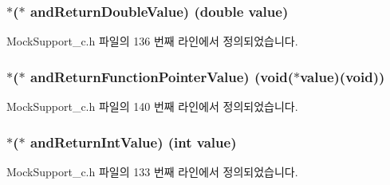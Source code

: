 \subsubsection[{\texorpdfstring{and\+Return\+Double\+Value}{andReturnDoubleValue}}]{$\ast$($\ast$ and\+Return\+Double\+Value) (double value)}\hypertarget{struct_s_mock_expected_call__c_a196e06d2d3472fc40be05701eb76d89f}{}\label{struct_s_mock_expected_call__c_a196e06d2d3472fc40be05701eb76d89f}


Mock\+Support\+\_\+c.\+h 파일의 136 번째 라인에서 정의되었습니다.

\subsubsection[{\texorpdfstring{and\+Return\+Function\+Pointer\+Value}{andReturnFunctionPointerValue}}]{$\ast$($\ast$ and\+Return\+Function\+Pointer\+Value) (void($\ast$value)(void))}\hypertarget{struct_s_mock_expected_call__c_aec92994602c7b6348285beaad764d3e8}{}\label{struct_s_mock_expected_call__c_aec92994602c7b6348285beaad764d3e8}


Mock\+Support\+\_\+c.\+h 파일의 140 번째 라인에서 정의되었습니다.

\subsubsection[{\texorpdfstring{and\+Return\+Int\+Value}{andReturnIntValue}}]{$\ast$($\ast$ and\+Return\+Int\+Value) (int value)}\hypertarget{struct_s_mock_expected_call__c_a4c20de86950113e4915a22bf0db7aeb8}{}\label{struct_s_mock_expected_call__c_a4c20de86950113e4915a22bf0db7aeb8}


Mock\+Support\+\_\+c.\+h 파일의 133 번째 라인에서 정의되었습니다.

